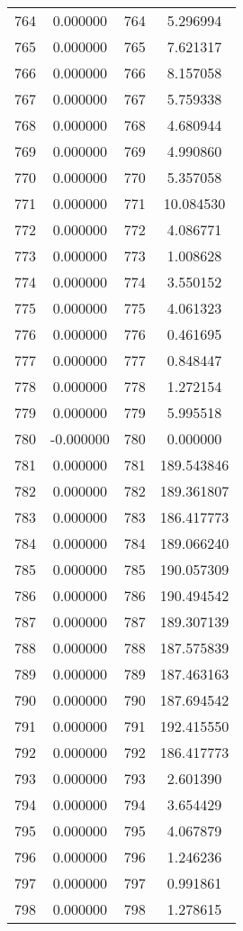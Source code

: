 \documentclass[12pt]{article}
\begin{document}
\begin{longtable}{@{}cccc@{}}
764 & 0.000000 & 764 & 5.296994 \\
765 & 0.000000 & 765 & 7.621317 \\
766 & 0.000000 & 766 & 8.157058 \\
767 & 0.000000 & 767 & 5.759338 \\
768 & 0.000000 & 768 & 4.680944 \\
769 & 0.000000 & 769 & 4.990860 \\
770 & 0.000000 & 770 & 5.357058 \\
771 & 0.000000 & 771 & 10.084530 \\
772 & 0.000000 & 772 & 4.086771 \\
773 & 0.000000 & 773 & 1.008628 \\
774 & 0.000000 & 774 & 3.550152 \\
775 & 0.000000 & 775 & 4.061323 \\
776 & 0.000000 & 776 & 0.461695 \\
777 & 0.000000 & 777 & 0.848447 \\
778 & 0.000000 & 778 & 1.272154 \\
779 & 0.000000 & 779 & 5.995518 \\
780 & -0.000000 & 780 & 0.000000 \\
781 & 0.000000 & 781 & 189.543846 \\
782 & 0.000000 & 782 & 189.361807 \\
783 & 0.000000 & 783 & 186.417773 \\
784 & 0.000000 & 784 & 189.066240 \\
785 & 0.000000 & 785 & 190.057309 \\
786 & 0.000000 & 786 & 190.494542 \\
787 & 0.000000 & 787 & 189.307139 \\
788 & 0.000000 & 788 & 187.575839 \\
789 & 0.000000 & 789 & 187.463163 \\
790 & 0.000000 & 790 & 187.694542 \\
791 & 0.000000 & 791 & 192.415550 \\
792 & 0.000000 & 792 & 186.417773 \\
793 & 0.000000 & 793 & 2.601390 \\
794 & 0.000000 & 794 & 3.654429 \\
795 & 0.000000 & 795 & 4.067879 \\
796 & 0.000000 & 796 & 1.246236 \\
797 & 0.000000 & 797 & 0.991861 \\
798 & 0.000000 & 798 & 1.278615 \\

\end{longtable}
\end{document}
